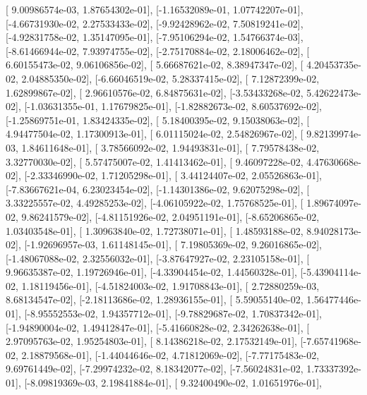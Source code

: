 \documentclass{article}
\begin{document}
       [ 9.00986574e-03,  1.87654302e-01],
       [-1.16532089e-01,  1.07742207e-01],
       [-4.66731930e-02,  2.27533433e-02],
       [-9.92428962e-02,  7.50819241e-02],
       [-4.92831758e-02,  1.35147095e-01],
       [-7.95106294e-02,  1.54766374e-03],
       [-8.61466944e-02,  7.93974755e-02],
       [-2.75170884e-02,  2.18006462e-02],
       [ 6.60155473e-02,  9.06106856e-02],
       [ 5.66687621e-02,  8.38947347e-02],
       [ 4.20453735e-02,  2.04885350e-02],
       [-6.66046519e-02,  5.28337415e-02],
       [ 7.12872399e-02,  1.62899867e-02],
       [ 2.96610576e-02,  6.84875631e-02],
       [-3.53433268e-02,  5.42622473e-02],
       [-1.03631355e-01,  1.17679825e-01],
       [-1.82882673e-02,  8.60537692e-02],
       [-1.25869751e-01,  1.83424335e-02],
       [ 5.18400395e-02,  9.15038063e-02],
       [ 4.94477504e-02,  1.17300913e-01],
       [ 6.01115024e-02,  2.54826967e-02],
       [ 9.82139974e-03,  1.84611648e-01],
       [ 3.78566092e-02,  1.94493831e-01],
       [ 7.79578438e-02,  3.32770030e-02],
       [ 5.57475007e-02,  1.41413462e-01],
       [ 9.46097228e-02,  4.47630668e-02],
       [-2.33346990e-02,  1.71205298e-01],
       [ 3.44124407e-02,  2.05526863e-01],
       [-7.83667621e-04,  6.23023454e-02],
       [-1.14301386e-02,  9.62075298e-02],
       [ 3.33225557e-02,  4.49285253e-02],
       [-4.06105922e-02,  1.75768525e-01],
       [ 1.89674097e-02,  9.86241579e-02],
       [-4.81151926e-02,  2.04951191e-01],
       [-8.65206865e-02,  1.03403548e-01],
       [ 1.30963840e-02,  1.72738071e-01],
       [ 1.48593188e-02,  8.94028173e-02],
       [-1.92696957e-03,  1.61148145e-01],
       [ 7.19805369e-02,  9.26016865e-02],
       [-1.48067088e-02,  2.32556032e-01],
       [-3.87647927e-02,  2.23105158e-01],
       [ 9.96635387e-02,  1.19726946e-01],
       [-4.33904454e-02,  1.44560328e-01],
       [-5.43904114e-02,  1.18119456e-01],
       [-4.51824003e-02,  1.91708843e-01],
       [ 2.72880259e-03,  8.68134547e-02],
       [-2.18113686e-02,  1.28936155e-01],
       [ 5.59055140e-02,  1.56477446e-01],
       [-8.95552553e-02,  1.94357712e-01],
       [-9.78829687e-02,  1.70837342e-01],
       [-1.94890004e-02,  1.49412847e-01],
       [-5.41660828e-02,  2.34262638e-01],
       [ 2.97095763e-02,  1.95254803e-01],
       [ 8.14386218e-02,  2.17532149e-01],
       [-7.65741968e-02,  2.18879568e-01],
       [-1.44044646e-02,  4.71812069e-02],
       [-7.77175483e-02,  9.69761449e-02],
       [-7.29974232e-02,  8.18342077e-02],
       [-7.56024831e-02,  1.73337392e-01],
       [-8.09819369e-03,  2.19841884e-01],
       [ 9.32400490e-02,  1.01651976e-01],
\end{document}
